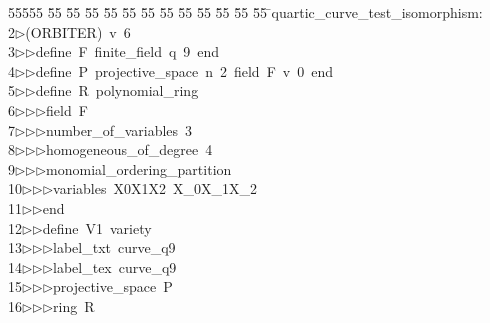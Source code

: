 %
%
\begin{tabbing}
55555 \= 55 \= 55 \= 55 \= 55 \= 55 \= 55 \= 55 \= 55 \= 55 \= 55 \= 55 \= 55 \= \>quartic\_curve\_test\_isomorphism:\\[0pt]
2\>$\triangleright$\>(ORBITER)\ v\ 6\ \\[0pt]
3\>$\triangleright$\>$\triangleright$\>define\ F\ finite\_field\ q\ 9\ end\ \\[0pt]
4\>$\triangleright$\>$\triangleright$\>define\ P\ projective\_space\ n\ 2\ field\ F\ v\ 0\ end\ \\[0pt]
5\>$\triangleright$\>$\triangleright$\>define\ R\ polynomial\_ring\ \\[0pt]
6\>$\triangleright$\>$\triangleright$\>$\triangleright$\>field\ F\ \\[0pt]
7\>$\triangleright$\>$\triangleright$\>$\triangleright$\>number\_of\_variables\ 3\ \\[0pt]
8\>$\triangleright$\>$\triangleright$\>$\triangleright$\>homogeneous\_of\_degree\ 4\ \\[0pt]
9\>$\triangleright$\>$\triangleright$\>$\triangleright$\>monomial\_ordering\_partition\ \\[0pt]
10\>$\triangleright$\>$\triangleright$\>$\triangleright$\>variables\ X0X1X2\ X\_0X\_1X\_2\ \\[0pt]
11\>$\triangleright$\>$\triangleright$\>end\ \\[0pt]
12\>$\triangleright$\>$\triangleright$\>define\ V1\ variety\ \\[0pt]
13\>$\triangleright$\>$\triangleright$\>$\triangleright$\>label\_txt\ curve\_q9\ \\[0pt]
14\>$\triangleright$\>$\triangleright$\>$\triangleright$\>label\_tex\ curve\_q9\ \\[0pt]
15\>$\triangleright$\>$\triangleright$\>$\triangleright$\>projective\_space\ P\ \\[0pt]
16\>$\triangleright$\>$\triangleright$\>$\triangleright$\>ring\ R\ \\[0pt]

\end{tabbing}
